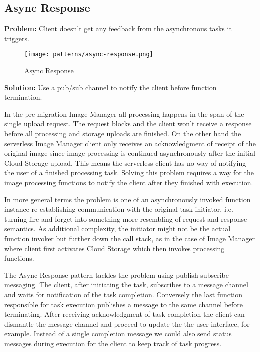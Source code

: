 \subsection{Async Response} \label{subsec:AsyncResponse}

\textbf{Problem:} Client doesn't get any feedback from the asynchronous tasks it triggers.

\begin{figure}[h]
  \centering
  \texttt{[image: patterns/async-response.png]}
  \caption{Async Response}
  \label{fig:asyncResponse}
\end{figure}

\textbf{Solution:} Use a pub/sub channel to notify the client before function termination.

In the pre-migration Image Manager all processing happens in the span of the single upload request. The request blocks and the client won't receive a response before all processing and storage uploads are finished. On the other hand the serverless Image Manager client only receives an acknowledgment of receipt of the original image since image processing is continued asynchronously after the initial Cloud Storage upload. This means the serverless client has no way of notifying the user of a finished processing task. Solving this problem requires a way for the image processing functions to notify the client after they finished with execution.

In more general terms the problem is one of an asynchronously invoked function instance re-establishing communication with the original task initiator, i.e. turning fire-and-forget into something more resembling of request-and-response semantics. As additional complexity, the initiator might not be the actual function invoker but further down the call stack, as in the case of Image Manager where client first activates Cloud Storage which then invokes processing functions.

The Async Response pattern tackles the problem using publish-subscribe messaging. The client, after initiating the task, subscribes to a message channel and waits for notification of the task completion. Conversely the last function responsible for task execution publishes a message to the same channel before terminating. After receiving acknowledgment of task completion the client can dismantle the message channel and proceed to update the the user interface, for example. Instead of a single completion message we could also send status messages during execution for the client to keep track of task progress.

